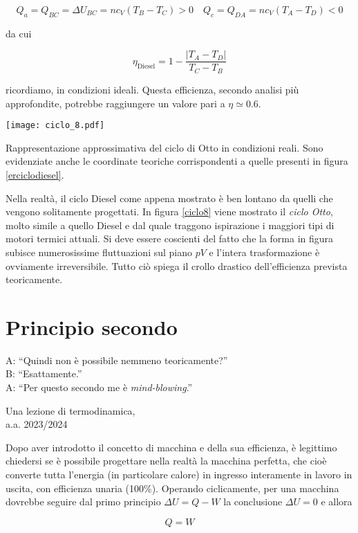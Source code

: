 \[ Q_a = Q_{BC} = \Delta U_{BC} = nc_V(T_B - T_C) > 0 \quad Q_c = Q_{DA} = nc_V(T_A - T_D) < 0 \]

\noindent da cui

\[ \eta_\text{Diesel} = 1 - \frac{|T_A - T_D|}{T_C - T_B} \]

\noindent ricordiamo, in condizioni ideali. Questa efficienza,
secondo analisi più approfondite, potrebbe raggiungere un
valore pari a $\eta \simeq 0.6$.

\begin{marginfigure}
    \centering
    \texttt{[image: ciclo\_8.pdf]}
    \caption{Rappresentazione approssimativa del ciclo di Otto in
    condizioni reali. Sono evidenziate anche le coordinate teoriche
    corrispondenti a quelle presenti in figura \ref{erciclodiesel}.}
    \label{ciclo8}
\end{marginfigure}

Nella realtà, il ciclo Diesel come appena mostrato è ben lontano
da quelli che vengono solitamente progettati. In figura \ref{ciclo8}
viene mostrato il \textit{ciclo Otto}, molto simile a quello Diesel
e dal quale traggono ispirazione i maggiori tipi di motori termici
attuali. Si deve essere coscienti del fatto che la forma in figura
subisce numerosissime fluttuazioni sul piano $pV$ e l'intera trasformazione
è ovviamente irreversibile. Tutto ciò spiega il crollo drastico
dell'efficienza prevista teoricamente.






\section{Principio secondo}
\epigraph{A: ``Quindi non è possibile nemmeno teoricamente?''\\B: ``Esattamente.''\\A: ``Per questo secondo me è \emph{mind-blowing}.''}{Una lezione di termodinamica,\\a.a. 2023/2024}

Dopo aver introdotto il concetto di macchina e della sua efficienza,
è legittimo chiedersi se è possibile progettare nella realtà
la macchina perfetta, che cioè converte tutta l'energia
(in particolare calore) in ingresso interamente in lavoro in uscita,
con efficienza unaria (100\%).
Operando ciclicamente, per una macchina dovrebbe seguire dal primo
principio $\Delta U = Q - W$ la conclusione $\Delta U = 0$ e allora

\[ Q = W \]

